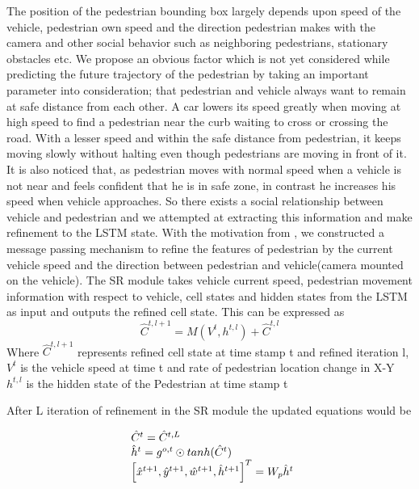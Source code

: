 The position of the pedestrian bounding box largely depends upon speed of the vehicle, pedestrian own speed and the direction pedestrian makes with the camera and other social behavior such as neighboring pedestrians, stationary obstacles etc. We propose an obvious factor which is not yet considered while predicting the future trajectory of the pedestrian by taking an important parameter into consideration; that pedestrian and vehicle always want to remain at safe distance from each other. A car lowers its speed greatly when moving at high speed to find a pedestrian near the curb waiting to cross or crossing the road. With a lesser speed and within the safe distance from pedestrian, it keeps moving slowly without halting even though pedestrians are moving in front of it.
It is also noticed that, as pedestrian moves with normal speed when a vehicle is not near and feels confident that he is in safe zone, in contrast he increases his speed when vehicle approaches. So there exists a social relationship between vehicle and pedestrian and we attempted at extracting this information and make refinement to the LSTM state. With the motivation from \cite{zhang2019sr}, we constructed a message passing mechanism to refine the features of pedestrian by the current vehicle speed and the direction between pedestrian and vehicle(camera mounted on the vehicle). The SR module takes vehicle current speed, pedestrian movement information with respect to vehicle, cell states and hidden states from the LSTM as input and outputs the refined cell state. This can be expressed as 
%
\begin{equation}
\hat{C}^{t, l+1}= M(V^t, {h}^{t, l}) + \hat{C}^{t, l}
\end{equation}
Where $\hat{C}^{t, l+1}$ represents refined cell state at time stamp t and refined iteration l, $V^t$ is the vehicle speed at time t and rate of pedestrian location change in X-Y \\
${h}^{t, l}$ is the hidden state of the Pedestrian at time stamp t

After L iteration of refinement in the SR module the updated equations would be

\begin{equation}
\begin{array}{l@{}}
\hat{C}^{t}=\hat{C}^{t, L} \\
\hat{h}^{t}={g}^{o,t} \odot tanh(\hat{C}^{t}) \\
\left[ \hat{x}^{t+1}, \hat{y}^{t+1}, \hat{w}^{t+1}, \hat{h}^{t+1} \right] ^ T = W_p\hat{h}^{t}
\end{array}
\end{equation}

